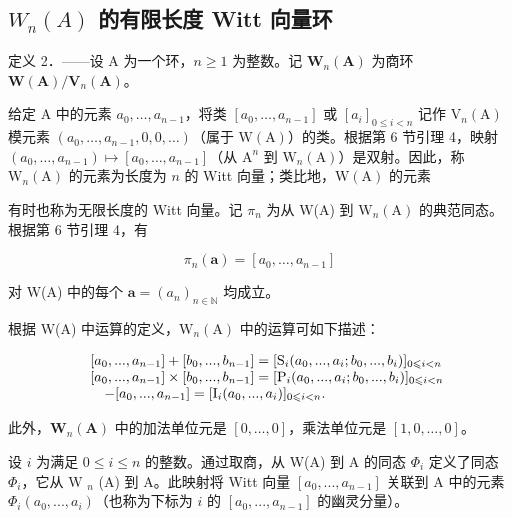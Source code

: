 \subsection{\texorpdfstring{\(W_{n}(A)\) 的有限长度 Witt 向量环}{W\_\{n\}(A) 的有限长度 Witt 向量环}}

定义 2．——设 A 为一个环，\(n \geqslant 1\) 为整数。记 \(\mathbf{W}_{n}(\mathbf{A})\) 为商环 \(\mathbf{W}(\mathbf{A}) / \mathbf{V}_{n}(\mathbf{A})\)。

给定 A 中的元素 \(a_0, \ldots, a_{n-1}\)，将类 \([a_0, \ldots, a_{n-1}]\) 或 \([a_i]_{0 \leq i < n}\) 记作 \(\mathrm{V}_n(\mathrm{A})\) 模元素 \((a_0, \ldots, a_{n-1}, 0, 0, \ldots)\)（属于 \(\mathrm{W}(\mathrm{A})\)）的类。根据第 6 节引理 4，映射 \((a_0, \ldots, a_{n-1}) \mapsto [a_0, \ldots, a_{n-1}]\)（从 \(\mathrm{A}^n\) 到 \(\mathrm{W}_n(\mathrm{A})\)）是双射。因此，称 \(\mathrm{W}_n(\mathrm{A})\) 的元素为长度为 \(n\) 的 Witt 向量；类比地，\(\mathrm{W}(\mathrm{A})\) 的元素

有时也称为无限长度的 Witt 向量。记 \(\pi_n\) 为从 W(A) 到 \(\mathrm{W}_n(\mathrm{A})\) 的典范同态。根据第 6 节引理 4，有

\[
\pi_ {n} (\boldsymbol {a}) = [ a _ {0}, \dots , a _ {n - 1} ]\tag{42}
\]

对 W(A) 中的每个 \(\boldsymbol{a} = (a_{n})_{n \in \mathbb{N}}\) 均成立。

根据 W(A) 中运算的定义，\(\mathrm{W}_{n}(\mathrm{A})\) 中的运算可如下描述：

\[
\begin{array}{r l} & {[ a _ {0},..., a _ {n - 1} ] + [ b _ {0},..., b _ {n - 1} ] = [ \mathrm{S} _ {i} (a _ {0},..., a _ {i}; b _ {0},..., b _ {i}) ] _ {0 \leqslant i <   n}} \\ & {[ a _ {0},..., a _ {n - 1} ] \times [ b _ {0},..., b _ {n - 1} ] = [ \mathrm{P} _ {i} (a _ {0},..., a _ {i}; b _ {0},..., b _ {i}) ] _ {0 \leqslant i <   n}} \\ & {\quad - [ a _ {0},..., a _ {n - 1} ] = [ \mathrm{I} _ {i} (a _ {0},..., a _ {i}) ] _ {0 \leqslant i <   n}.} \end{array}
\]

此外，\(\mathbf{W}_{n}(\mathbf{A})\) 中的加法单位元是 \([0,\dots,0]\)，乘法单位元是 \([1,0,\dots,0]\)。

设 \(i\) 为满足 \(0 \leqslant i \leqslant n\) 的整数。通过取商，从 W(A) 到 A 的同态 \(\Phi_{i}\) 定义了同态 \(\Phi_{i}\)，它从 W \(_{n}\) (A) 到 A。此映射将 Witt 向量 \([a_{0}, ..., a_{n-1}]\) 关联到 A 中的元素 \(\Phi_{i}(a_{0}, ..., a_{i})\)（也称为下标为 \(i\) 的 \([a_{0}, ..., a_{n-1}]\) 的幽灵分量）。

